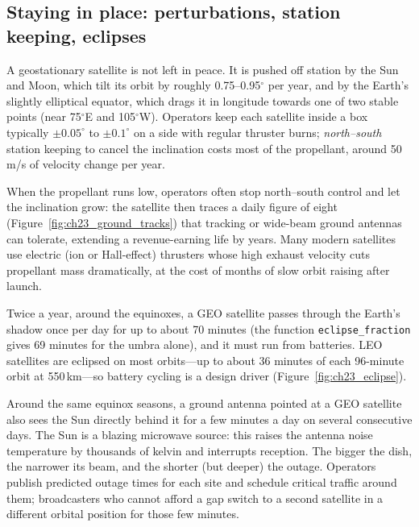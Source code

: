 \subsection{Staying in place: perturbations, station keeping, eclipses}

A geostationary satellite is not left in peace. It is pushed off station by the Sun and Moon,
which tilt its orbit by roughly 0.75--0.95$^\circ$ per year, and by the Earth's slightly elliptical
equator, which drags it in longitude towards one of two stable points (near 75$^\circ$E and
105$^\circ$W). Operators keep each satellite inside a box typically $\pm0.05^\circ$ to $\pm0.1^\circ$
on a side with regular thruster burns; \emph{north--south} station keeping to cancel the
inclination costs most of the propellant, around 50\,m/s of velocity change per year.

When the propellant runs low, operators often stop north--south control and let the inclination
grow: the satellite then traces a daily figure of eight (Figure~\ref{fig:ch23_ground_tracks}) that
tracking or wide-beam ground antennas can tolerate, extending a revenue-earning life by years. Many
modern satellites use electric (ion or Hall-effect) thrusters whose high exhaust velocity cuts
propellant mass dramatically, at the cost of months of slow orbit raising after launch.

Twice a year, around the equinoxes, a GEO satellite passes through the Earth's shadow once per
day for up to about 70 minutes (the function \texttt{eclipse\_fraction} gives 69 minutes for
the umbra alone), and it must run from batteries. LEO satellites are eclipsed on most
orbits---up to about 36 minutes of each 96-minute orbit at 550\,km---so battery cycling is a design
driver (Figure~\ref{fig:ch23_eclipse}).


\begin{inpractice}
Around the same equinox seasons, a ground antenna pointed at a GEO satellite also sees the Sun
directly behind it for a few minutes a day on several consecutive days. The Sun is a blazing
microwave source: this  raises the antenna noise temperature by thousands of
kelvin and interrupts reception. The bigger the dish, the narrower its beam, and the shorter (but
deeper) the outage. Operators publish predicted outage times for each site and schedule critical
traffic around them; broadcasters who cannot afford a gap switch to a second satellite in a
different orbital position for those few minutes.
\end{inpractice}

